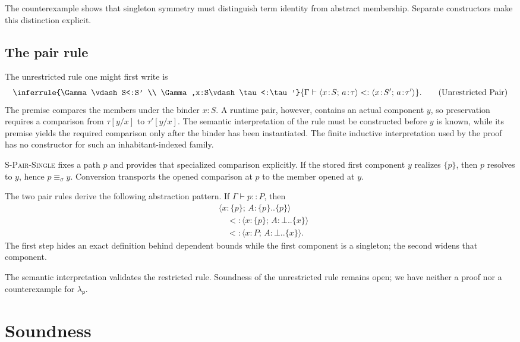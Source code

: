 \documentclass[acmsmall,screen,nonacm]{acmart}
\newcommand{\lambdap}{\ensuremath{\lambda_{\mathsf p}}}
\newcommand{\sing}[1]{\{#1\}}
\newcommand{\pairty}[4]{\langle #1\!:\!#2;\,#3\!:\!#4\rangle}
\newcommand{\subst}[3]{#1[#2/#3]}
\newcommand{\runtimeeq}{\mathrel{\equiv_{\sigma}}}
\begin{document}
The counterexample shows that singleton symmetry must distinguish term
identity from abstract membership. Separate constructors make this
distinction explicit.

\subsection{The pair rule}

The unrestricted rule one might first write is
\[
\inferrule
  {\Gamma\vdash S<:S'
   \\
   \Gamma,x:S\vdash\tau<:\tau'}
  {\Gamma\vdash
    \pairty{x}{S}{a}{\tau}
    <:
    \pairty{x}{S'}{a}{\tau'}}.
\tag{Unrestricted Pair}
\]
The premise compares the members under the binder \(x:S\). A runtime pair,
however, contains an actual component \(y\), so preservation requires a
comparison from \(\subst{\tau}{y}{x}\) to \(\subst{\tau'}{y}{x}\). The
semantic interpretation of the rule must be constructed before \(y\) is
known, while its premise yields the required comparison only after the binder
has been instantiated. The finite inductive interpretation used by the proof
has no constructor for such an inhabitant-indexed family.

\textsc{S-Pair-Single} fixes a path \(p\) and provides that specialized
comparison explicitly. If the stored first component \(y\) realizes
\(\sing{p}\), then \(p\) resolves to \(y\), hence \(p\runtimeeq y\).
Conversion transports the opened comparison at \(p\) to the member opened at
\(y\).

The two pair rules derive the following abstraction pattern. If
\(\Gamma\vdash p::P\), then
\[
\begin{aligned}
&\pairty{x}{\sing{p}}{A}{\sing{p}..\sing{p}}
\\[-1mm]
&\quad<:\pairty{x}{\sing{p}}{A}{\bot..\sing{x}}
\\[-1mm]
&\quad<:\pairty{x}{P}{A}{\bot..\sing{x}}.
\end{aligned}
\]
The first step hides an exact definition behind dependent bounds while the
first component is a singleton; the second widens that component.

The semantic interpretation validates the restricted rule. Soundness of the
unrestricted rule remains open; we have neither a proof nor a counterexample
for \lambdap{}.

\section{Soundness}
\label{sec:soundness}
\end{document}
